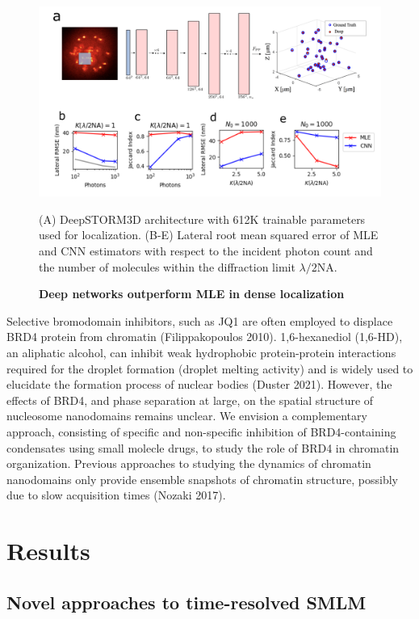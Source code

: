 \documentclass{ucetd}
\begin{document}
\begin{figure}
\includegraphics[width=\textwidth]{PSF2D.png}
\caption{\textbf{Deep networks outperform MLE in dense localization}} (A) DeepSTORM3D architecture with 612K trainable parameters used for localization. (B-E) Lateral root mean squared error of MLE and CNN estimators with respect to the incident photon count and the number of molecules within the diffraction limit $\lambda/2\mathrm{NA}$.
\end{figure}

Selective bromodomain inhibitors, such as JQ1 are often employed to displace BRD4 protein from chromatin (Filippakopoulos 2010). 1,6-hexanediol (1,6-HD), an aliphatic alcohol, can inhibit weak hydrophobic protein-protein interactions required for the droplet formation (droplet melting activity) and is widely used to elucidate the formation process of nuclear bodies (Duster 2021). However, the effects of BRD4, and phase separation at large, on the spatial structure of nucleosome nanodomains remains unclear. We envision a complementary approach, consisting of specific and non-specific inhibition of BRD4-containing condensates using small molecle drugs, to study the role of BRD4 in chromatin organization. Previous approaches to studying the dynamics of chromatin nanodomains only provide ensemble snapshots of chromatin structure, possibly due to slow acquisition times (Nozaki 2017). 


\section{Results}

\subsection{Novel approaches to time-resolved SMLM}
\end{document}

